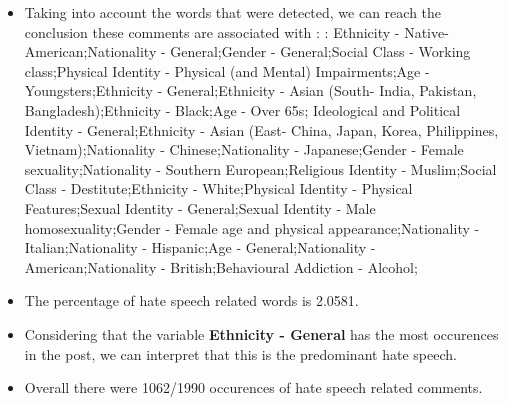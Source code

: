 \documentclass[11pt]{article}
\begin{document}
\begin{itemize}\item Taking into account the words that were detected, we can reach the conclusion these comments are associated with : : Ethnicity - Native-American;Nationality - General;Gender - General;Social Class - Working class;Physical Identity - Physical (and Mental) Impairments;Age - Youngsters;Ethnicity - General;Ethnicity - Asian (South- India, Pakistan, Bangladesh);Ethnicity - Black;Age - Over 65s; Ideological and Political Identity - General;Ethnicity - Asian (East- China, Japan, Korea, Philippines, Vietnam);Nationality - Chinese;Nationality - Japanese;Gender - Female sexuality;Nationality - Southern European;Religious Identity - Muslim;Social Class - Destitute;Ethnicity - White;Physical Identity - Physical Features;Sexual Identity - General;Sexual Identity - Male homosexuality;Gender - Female age and physical appearance;Nationality - Italian;Nationality - Hispanic;Age - General;Nationality - American;Nationality - British;Behavioural Addiction - Alcohol;%

\item The percentage of hate speech related words is 2.0581.

\item Considering that the variable \textbf{Ethnicity - General} has the most occurences in the post, we can interpret that this is the predominant hate speech.

\item Overall there were 1062/1990 occurences of hate speech related comments.\end{itemize}
\end{document}
